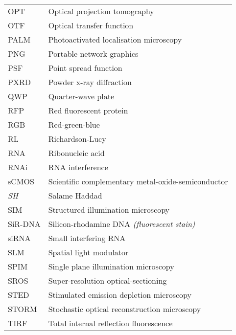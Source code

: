 \begin{flushleft}
\begin{longtable}[l]{|p{5.5em}|p{25em}|}
OPT        & Optical projection tomography                              \\
OTF        & Optical transfer function                                  \\
PALM       & Photoactivated localisation microscopy                     \\
PNG        & Portable network graphics                                  \\
PSF        & Point spread function                                      \\
PXRD       & Powder x-ray diffraction                                   \\
QWP        & Quarter-wave plate                                         \\
RFP        & Red fluorescent protein                                    \\
RGB        & Red-green-blue                                             \\
RL         & Richardson-Lucy                                            \\
RNA        & Ribonucleic acid                                           \\
RNAi       & RNA interference                                           \\
sCMOS      & Scientific complementary metal-oxide-semiconductor         \\
\textit{SH} & Salame Haddad                                              \\
SIM        & Structured illumination microscopy                         \\
SiR-DNA    & Silicon-rhodamine DNA \textit{(fluorescent stain)}                  \\
siRNA      & Small interfering RNA                                      \\
SLM        & Spatial light modulator                                    \\
SPIM       & Single plane illumination microscopy                       \\
SROS       & Super-resolution optical-sectioning                        \\
STED       & Stimulated emission depletion microscopy                   \\
STORM      & Stochastic optical reconstruction microscopy              \\
TIRF       & Total internal reflection fluorescence                     \\

\end{longtable}
\end{flushleft}
